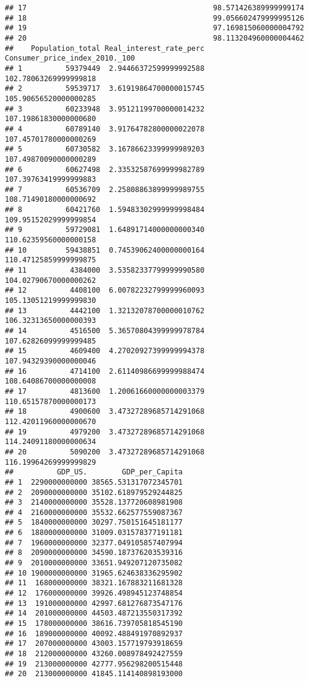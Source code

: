 \documentclass[
]{article}
\begin{document}
\begin{verbatim}
## 17                                           98.571426389999999174
## 18                                           99.056602479999995126
## 19                                           97.169815060000004792
## 20                                           98.113204960000004462
##    Population_total Real_interest_rate_perc Consumer_price_index_2010._100
## 1          59379449  2.94466372599999992588          102.78063269999999818
## 2          59539717  3.61919864700000015745          105.90656520000000285
## 3          60233948  3.95121199700000014232          107.19861830000000680
## 4          60789140  3.91764782800000022078          107.45701780000000269
## 5          60730582  3.16786623399999989203          107.49870090000000289
## 6          60627498  2.33532587699999982789          107.39763419999999883
## 7          60536709  2.25808863899999989755          108.71490180000000692
## 8          60421760  1.59483302999999998484          109.95152029999999854
## 9          59729081  1.64891714000000000340          110.62359560000000158
## 10         59438851  0.74539062400000000164          110.47125859999999875
## 11          4384000  3.53582337799999990580          104.02790670000000262
## 12          4408100  6.00782232799999960093          105.13051219999999830
## 13          4442100  1.32132078700000010762          106.32313650000000393
## 14          4516500  5.36570804399999978784          107.62826099999999485
## 15          4609400  4.27020927399999994378          107.94329390000000046
## 16          4714100  2.61140986699999988474          108.64086700000000008
## 17          4813600  1.20061660000000003379          110.65157870000000173
## 18          4900600  3.47327289685714291068          112.42011960000000670
## 19          4979200  3.47327289685714291068          114.24091180000000634
## 20          5090200  3.47327289685714291068          116.19964269999999829
##          GDP_US.        GDP_per_Capita
## 1  2290000000000 38565.531317072345701
## 2  2090000000000 35102.618979529244825
## 3  2140000000000 35528.137720608981908
## 4  2160000000000 35532.662577559087367
## 5  1840000000000 30297.750151645181177
## 6  1880000000000 31009.031578377191181
## 7  1960000000000 32377.049105857407994
## 8  2090000000000 34590.187376203539316
## 9  2010000000000 33651.949207120735082
## 10 1900000000000 31965.624638336295902
## 11  168000000000 38321.167883211681328
## 12  176000000000 39926.498945123748854
## 13  191000000000 42997.681276873547176
## 14  201000000000 44503.487213550317392
## 15  178000000000 38616.739705818545190
## 16  189000000000 40092.488491970892937
## 17  207000000000 43003.157719793918659
## 18  212000000000 43260.008978492427559
## 19  213000000000 42777.956298200515448
## 20  213000000000 41845.114140898193000
\end{verbatim}
\end{document}
